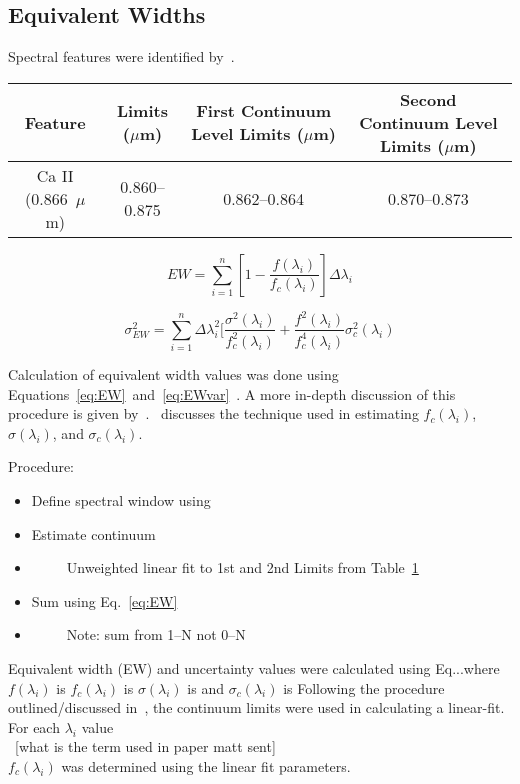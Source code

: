 \subsection{Equivalent Widths}


Spectral features were identified by~\cite{Rayner_2009}.  

\begin{table}[H]
	\begin{tabular}{c|c|c|c}
	\label{tab:features}
		Feature & Limits ($\mu$m) & First Continuum Level Limits ($\mu$m) & Second Continuum Level Limits ($\mu$m) \\ \hline
		Ca II (0.866~$\mu$m) & 0.860--0.875 & 0.862--0.864 & 0.870--0.873 \\
	\end{tabular}
\end{table}

\begin{equation}\label{eq:EW}
	EW = \sum_{i=1}^{n} [1 - \frac{f(\lambda_{i})}{f_{c}(\lambda_{i})}] \Delta\lambda_{i}
\end{equation}

\begin{equation}\label{eq:EWvar}
	\sigma_{EW}^{2} = \sum_{i=1}^{n} \Delta\lambda_{i}^{2} [\frac{\sigma^{2}(\lambda_{i})}{f_{c}^{2}(\lambda_{i})} + \frac{f^{2}(\lambda_{i})}{f_{c}^{4}(\lambda_{i})}\sigma_{c}^{2}(\lambda_{i})
\end{equation}


Calculation of equivalent width values was done using Equations~\ref{eq:EW}~and~\ref{eq:EWvar}~\cite{Cushing_2005}.  A more in-depth discussion of this procedure is given by~\cite{Cushing_2005}.  \cite{Sembach_1992}~discusses the technique used in estimating $f_{c}(\lambda_{i})$, $\sigma(\lambda_{i})$, and $\sigma_{c}(\lambda_{i})$.

Procedure:\\
\begin{itemize}
	\item{} Define spectral window using
	\item{} Estimate continuum
	\item{}~~~~~Unweighted linear fit to 1st and 2nd Limits from Table~\ref{tab:features}
	\item{} Sum using Eq.~\ref{eq:EW}
	\item{}~~~~~Note: sum from 1--N not 0--N
\end{itemize}



Equivalent width (EW) and uncertainty values were calculated using Eq...where $f(\lambda_{i})$ is
$f_{c}(\lambda_{i})$ is
$\sigma(\lambda_{i})$ is
and $\sigma_{c}(\lambda_{i})$ is
Following the procedure outlined/discussed in~\cite{Cushing_2005}, the continuum limits were used in calculating a linear-fit.  For each $\lambda_{i}$ value\\
~[what is the term used in paper matt sent]\\
$f_{c}(\lambda_{i})$ was determined using the linear fit parameters.


